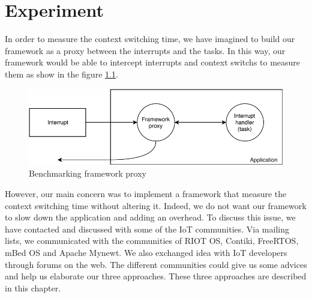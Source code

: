 \chapter{Experiment \label{chap:experiment}}

In order to measure the context switching time, we have imagined to build our framework as a proxy between the interrupts and the tasks.
In this way, our framework would be able to intercept interrupts and context switchs to measure them as show in the figure \ref{fig:proxy-framework}.

\begin{figure}[!ht]
  \centering
  \includegraphics[scale=1]{assets/proxy-framework.pdf}
  \caption{Benchmarking framework proxy\label{fig:proxy-framework}}
\end{figure}


However, our main concern was to implement a framework that measure the context switching time without altering it.
Indeed, we do not want our framework to slow down the application and adding an overhead.
To discuss this issue, we have contacted and discussed with some of the IoT communities.
Via mailing lists, we communicated with the communities of RIOT OS, Contiki, FreeRTOS, mBed OS and Apache Mynewt.
We also exchanged idea with IoT developers through forums on the web.
The different communities could give us some advices and help us elaborate our three approaches.
These three approaches are described in this chapter.



